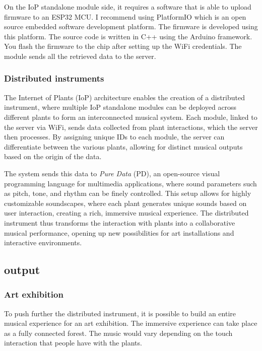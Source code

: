 On the IoP standalone module side, it requires a software that is able to upload
firmware to an ESP32 MCU. I recommend using PlatformIO which is an open source
embedded software development platform. The firmware is developed using this platform.
The source code is written in C++ using the Arduino framework. You flash the firmware
to the chip after setting up the WiFi credentials.
The module sends all the retrieved data to the server.

\subsubsection{Distributed instruments}

The Internet of Plants (IoP) architecture enables the creation of a distributed instrument, where multiple IoP standalone modules can be deployed across different plants to form an interconnected musical system. Each module, linked to the server via WiFi, sends data collected from plant interactions, which the server then processes. By assigning unique IDs to each module, the server can differentiate between the various plants, allowing for distinct musical outputs based on the origin of the data.

The system sends this data to \textit{Pure Data} (PD), an open-source visual programming language for multimedia applications, where sound parameters such as pitch, tone, and rhythm can be finely controlled. This setup allows for highly customizable soundscapes, where each plant generates unique sounds based on user interaction, creating a rich, immersive musical experience. The distributed instrument thus transforms the interaction with plants into a collaborative musical performance, opening up new possibilities for art installations and interactive environments.

\subsection{output}

\subsubsection{Art exhibition}

To push further the distributed instrument, it is possible to build an entire
musical experience for an art exhibition.
The immersive experience can take place as a fully connected forest. The music would vary
depending on the touch interaction that people have with the plants.


